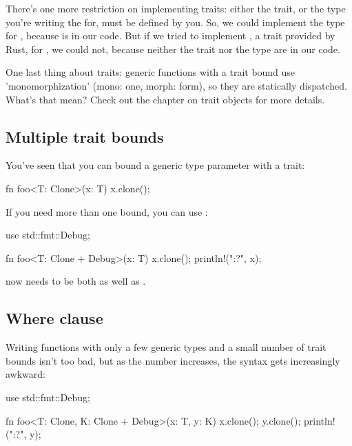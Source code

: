 \blank

There's one more restriction on implementing traits: either the trait, or the type you're writing the  for, must be defined 
by you. So, we could implement the  type for \itt, because  is in our code. But if we tried to implement 
, a trait provided by Rust, for \itt, we could not, because neither the trait nor the type are in our code.

\blank

One last thing about traits: generic functions with a trait bound use 'monomorphization' (mono: one, morph: form), so they are 
statically dispatched. What's that mean? Check out the chapter on trait objects for more details.

\subsection*{Multiple trait bounds}

You've seen that you can bound a generic type parameter with a trait:

\begin{rustc}
fn foo<T: Clone>(x: T) {
    x.clone();
}
\end{rustc}

If you need more than one bound, you can use \code{+}:

\begin{rustc}
use std::fmt::Debug;

fn foo<T: Clone + Debug>(x: T) {
    x.clone();
    println!("{:?}", x);
}
\end{rustc}

 now needs to be both  as well as .

\subsection*{Where clause}

Writing functions with only a few generic types and a small number of trait bounds isn't too bad, but as the number increases, the 
syntax gets increasingly awkward:

\begin{rustc}
use std::fmt::Debug;

fn foo<T: Clone, K: Clone + Debug>(x: T, y: K) {
    x.clone();
    y.clone();
    println!("{:?}", y);
}
\end{rustc}

